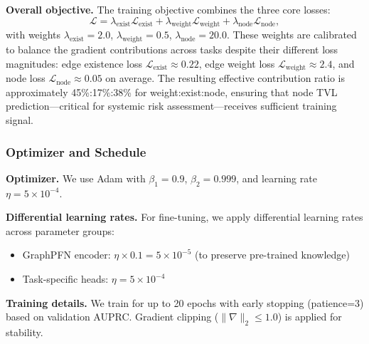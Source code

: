 \textbf{Overall objective.}
The training objective combines the three core losses:
\begin{equation}
\mathcal L = \lambda_{\mathrm{exist}} \mathcal L_{\mathrm{exist}} + \lambda_{\mathrm{weight}} \mathcal L_{\mathrm{weight}} + \lambda_{\mathrm{node}} \mathcal L_{\mathrm{node}},
\label{eq:loss-total}
\end{equation}
with weights $\lambda_{\mathrm{exist}} = 2.0$, $\lambda_{\mathrm{weight}} = 0.5$, $\lambda_{\mathrm{node}} = 20.0$. These weights are calibrated to balance the gradient contributions across tasks despite their different loss magnitudes: edge existence loss $\mathcal{L}_{\mathrm{exist}} \approx 0.22$, edge weight loss $\mathcal{L}_{\mathrm{weight}} \approx 2.4$, and node loss $\mathcal{L}_{\mathrm{node}} \approx 0.05$ on average. The resulting effective contribution ratio is approximately 45\%:17\%:38\% for weight:exist:node, ensuring that node TVL prediction---critical for systemic risk assessment---receives sufficient training signal.

\subsubsection{Optimizer and Schedule}

\textbf{Optimizer.}
We use Adam with $\beta_1=0.9$, $\beta_2=0.999$, and learning rate $\eta = 5 \times 10^{-4}$.

\textbf{Differential learning rates.}
For fine-tuning, we apply differential learning rates across parameter groups:
\begin{itemize}
  \item GraphPFN encoder: $\eta \times 0.1 = 5 \times 10^{-5}$ (to preserve pre-trained knowledge)
  \item Task-specific heads: $\eta = 5 \times 10^{-4}$
\end{itemize}

\textbf{Training details.}
We train for up to 20 epochs with early stopping (patience=3) based on validation AUPRC. Gradient clipping ($\|\nabla\|_2 \le 1.0$) is applied for stability.

